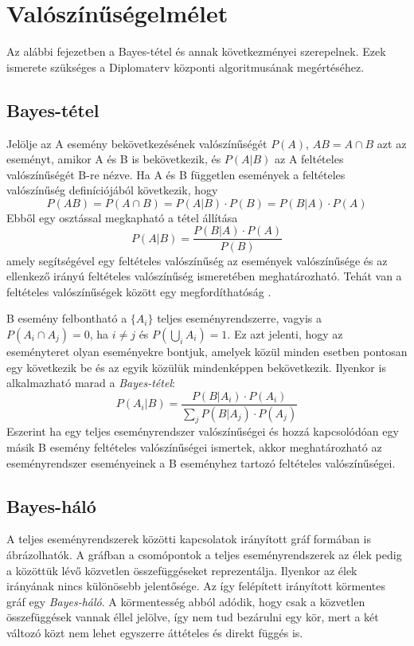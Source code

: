 \chapter{Valószínűségelmélet}

Az alábbi fejezetben a Bayes-tétel és annak következményei szerepelnek. Ezek ismerete szükséges a Diplomaterv központi algoritmusának megértéséhez.

\section{Bayes-tétel}
Jelölje az A esemény bekövetkezésének valószínűségét $P(A)$, $AB = A \cap B$ azt az eseményt, amikor A és B is bekövetkezik, és $P(A|B)$ az A feltételes valószínűségét B-re nézve. Ha A és B független események a feltételes valószínűség definíciójából következik, hogy
$$P(AB) = P(A \cap B) = P(A|B) \cdot P(B) =  P(B|A) \cdot P(A) $$
Ebből egy osztással megkapható a tétel állítása
$$P(A|B) = \frac{P(B|A) \cdot P(A)}{P(B)}$$
amely segítségével egy feltételes valószínűség az események valószínűsége és az ellenkező irányú feltételes valószínűség ismeretében meghatározható. Tehát van a feltételes valószínűségek között egy megfordíthatóság \cite{laszlo2011bayesi}.

B esemény felbontható a $\{A_i\}$ teljes eseményrendszerre, vagyis a $P(A_i \cap A_j) = 0$, ha $i \neq j$ és $ P(\bigcup_{i} A_i) = 1$. Ez azt jelenti, hogy az eseményteret olyan eseményekre bontjuk, amelyek közül minden esetben pontosan egy következik be és az egyik közülük mindenképpen bekövetkezik. Ilyenkor is alkalmazható marad a \emph{Bayes-tétel}:
$$P(A_i|B) = \frac{P(B|A_i) \cdot P(A_i)}{\sum_{j} P(B|A_j) \cdot P(A_j)}$$
Eszerint ha egy teljes eseményrendszer valószínűségei és hozzá kapcsolódóan egy másik B esemény feltételes valószínűségei ismertek, akkor meghatározható az eseményrendszer eseményeinek a B eseményhez tartozó feltételes valószínűségei.

\section{Bayes-háló}
A teljes eseményrendszerek közötti kapcsolatok irányított gráf formában is ábrázolhatók. A gráfban a csomópontok a teljes eseményrendszerek az élek pedig a közöttük lévő közvetlen összefüggéseket reprezentálja. Ilyenkor az élek irányának nincs különösebb jelentősége. Az így felépített irányított körmentes gráf egy \emph{Bayes-háló}. A körmentesség abból adódik, hogy csak a közvetlen összefüggések vannak éllel jelölve, így nem tud bezárulni egy kör, mert a két változó közt nem lehet egyszerre áttételes és direkt függés is.


